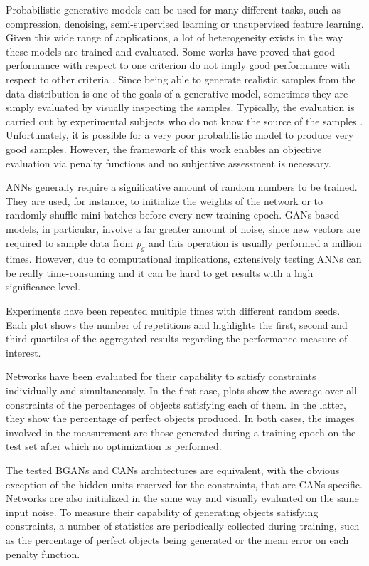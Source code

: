 Probabilistic generative models can be used for many different tasks, such as compression, denoising, semi-supervised learning or unsupervised feature learning. Given this wide range of applications, a lot of heterogeneity exists in the way these models are trained and evaluated. Some works have proved that good performance with respect to one criterion do not imply good performance with respect to other criteria \cite{evaluation}. Since being able to generate realistic samples from the data distribution
is one of the goals of a generative model, sometimes they are simply evaluated by visually inspecting the samples. Typically, the evaluation is carried out by experimental subjects who do not know the source of the samples \cite{human_evaluators}. Unfortunately, it is possible for a very poor probabilistic model to produce very good samples. However, the framework of this work enables an objective evaluation via penalty functions and no subjective assessment is necessary.

ANNs generally require a significative amount of random numbers to be trained. They are used, for instance, to initialize the weights of the network or to randomly shuffle mini-batches before every new training epoch. GANs-based models, in particular, involve a far greater amount of noise, since new vectors are required to sample data from $p_g$ and this operation is usually performed a million times. However, due to computational implications, extensively testing ANNs can be really time-consuming and it can be hard to get results with a high significance level.

Experiments have been repeated multiple times with different random seeds. Each plot shows the number of repetitions and highlights the first, second and third quartiles of the aggregated results regarding the performance measure of interest.

Networks have been evaluated for their capability to satisfy constraints individually and simultaneously. In the first case, plots show the average over all constraints of the percentages of objects satisfying each of them. In the latter, they show the percentage of perfect objects produced. In both cases, the images involved in the measurement are those generated during a training epoch on the test set after which no optimization is performed.

The tested BGANs and CANs architectures are equivalent, with the obvious exception of the hidden units reserved for the constraints, that are CANs-specific. Networks are also initialized in the same way and visually evaluated on the same input noise. To measure their capability of generating objects satisfying constraints, a number of statistics are periodically collected during training, such as the percentage of perfect objects being generated or the mean error on each penalty function.

